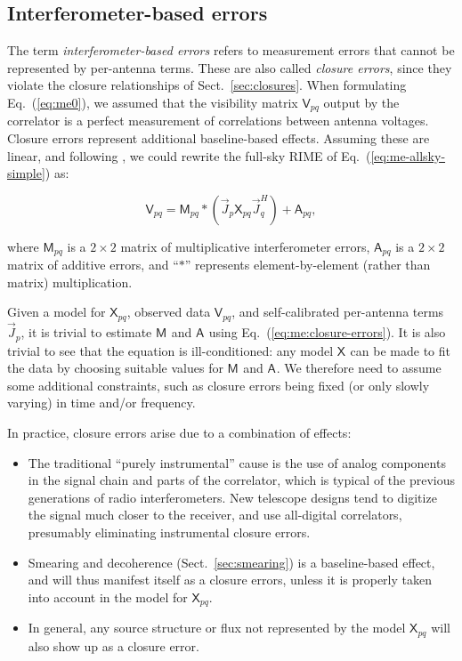 \documentclass[referee]{aa}
\newcommand{\herm}{H}
\newcommand{\jones}[2]{\vec {#1}_{#2}}
\newcommand{\jonesT}[2]{\vec {#1}^{\herm}_{#2}}
\newcommand{\coh}[2]{\mathsf{{#1}}_{{#2}}}
\begin{document}
\subsection{\label{sec:closure-errors}Interferometer-based errors}

The term {\em interferometer-based errors} refers to measurement errors that cannot be represented by per-antenna terms.
These are also called {\em closure errors}, since they violate the closure relationships of Sect.~\ref{sec:closures}. When formulating Eq.~(\ref{eq:me0}), we assumed that the visibility matrix $\coh{V}{pq}$ output by the correlator is a perfect measurement of correlations between antenna voltages. Closure errors represent additional baseline-based effects. Assuming these are linear, and following \citet{JEN:note185}, we could rewrite the full-sky RIME of Eq.~(\ref{eq:me-allsky-simple}) as: 

    \begin{equation}\label{eq:me:closure-errors}
    \coh{V}{pq} = \coh{M}{pq} \ast ( \jones{J}{p} \coh{X}{pq}  \jonesT{J}{q} ) + \coh{A}{pq},
    \end{equation}

where $\coh{M}{pq}$ is a $2\times2$ matrix of multiplicative interferometer errors, $\coh{A}{pq}$ is a $2\times2$ matrix of additive errors, and ``$\ast$'' represents element-by-element (rather than matrix) multiplication.

Given a model for $\coh{X}{pq}$, observed data $\coh{V}{pq}$, and self-calibrated per-antenna terms $\jones{J}{p}$, it is trivial to estimate $\coh{M}{}$ and $\coh{A}{}$ using Eq.~(\ref{eq:me:closure-errors}). It is also trivial to see that the equation is ill-conditioned: any model $\coh{X}{}$ can be made to fit the data by choosing suitable values for $\coh{M}{}$ and $\coh{A}{}$. We therefore need to assume some additional constraints, such as closure errors being fixed (or only slowly varying) in time and/or frequency. 

In practice, closure errors arise due to a combination of effects:

\begin{itemize}
\item The traditional ``purely instrumental'' cause is the use of analog components in the signal chain and parts of the correlator, which is typical of the previous generations of radio interferometers. New telescope designs tend to digitize the signal much closer to the receiver, and use all-digital correlators, presumably eliminating instrumental closure errors. 
\item Smearing and decoherence (Sect.~\ref{sec:smearing}) is a baseline-based effect, and will thus manifest itself as a closure errors, unless it is properly taken into account in the model for $\coh{X}{pq}$.
\item In general, any source structure or flux not represented by the model $\coh{X}{pq}$ will also show up as a closure error.
\end{itemize}
\end{document}
